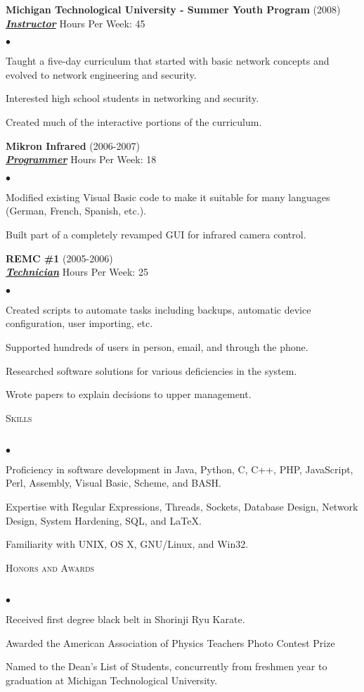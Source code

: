 \documentclass{article}
\newcommand{\lineunder}{\vspace*{-8pt} \\ \hspace*{-18pt} \hrulefill \\}
\newcommand{\header}[1]{{\hspace*{-15pt}\vspace*{6pt} \textsc{#1}} \vspace*{-6pt} \lineunder}
\newcommand{\employer}[4]{{ \textbf{#1} (#2)\\ \underline{\textbf{\emph{#3}}} \hfill Hours Per Week: #4 \\  }}
\newenvironment{achievements}{\begin{list}{$\bullet$}{\topsep 0pt \itemsep -2pt}}{\vspace*{4pt}\end{list}}
\begin{document}
\employer{Michigan Technological University - Summer Youth Program}{2008}{Instructor}{45}
\begin{achievements}
	\item Taught a five-day curriculum that started with basic network concepts and evolved to network engineering and security.
	\item Interested high school students in networking and security.
	\item Created much of the interactive portions of the curriculum.
\end{achievements}

\employer{Mikron Infrared}{2006-2007}{Programmer}{18}
\begin{achievements}
	\item Modified existing Visual Basic code to make it suitable for many languages (German, French, Spanish, etc.).
	\item Built part of a completely revamped GUI for infrared camera control.
\end{achievements}

\employer{REMC \#1}{2005-2006}{Technician}{25}
\begin{achievements}
	\item Created scripts to automate tasks including backups, automatic device configuration, user importing, etc. 
	\item Supported hundreds of users in person, email, and through the phone.
	\item Researched software solutions for various deficiencies in the system.
	\item Wrote papers to explain decisions to upper management.
\end{achievements}

\header{Skills}
\begin{achievements}
	\item Proficiency in software development in Java, Python, C, C++, PHP, JavaScript, Perl, Assembly, Visual Basic, Scheme, and BASH.
	\item Expertise with Regular Expressions, Threads, Sockets, Database Design, Network Design, System Hardening, SQL, and \LaTeX.
	\item Familiarity with UNIX, OS X, GNU/Linux, and Win32.
\end{achievements}

\header{Honors and Awards}
\begin{achievements}
	\item Received first degree black belt in Shorinji Ryu Karate.
	\item Awarded the American Association of Physics Teachers Photo Contest Prize
	\item Named to the Dean's List of Students, concurrently from freshmen year to graduation at Michigan Technological University.
\end{achievements}
\end{document}
